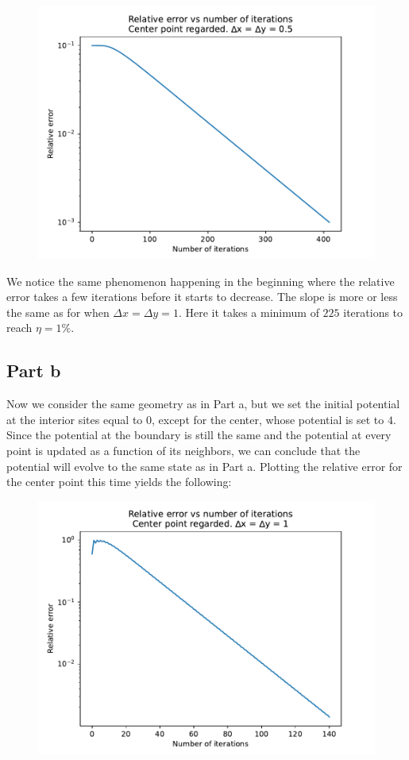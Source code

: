 \documentclass[a4paper,12pt]{article}
\begin{document}
\begin{figure}[!ht]
  \centering
  \includegraphics[scale=0.49]{img/4_1a_errorvsn_smallerd.pdf}
\end{figure}

We notice the same phenomenon happening in the beginning where the relative error takes a few iterations before it
starts to decrease. The slope is more or less the same as for when $\Delta x = \Delta y = 1$. Here it takes a minimum
of $225$ iterations to reach $\eta = 1\%$.

\subsection*{Part b}

Now we consider the same geometry as in Part a, but we set the initial potential at the interior sites equal to $0$,
except for the center, whose potential is set to $4$. Since the potential at the boundary is still the same and the
potential at every point is updated as a function of its neighbors, we can conclude that the potential will evolve to
the same state as in Part a. Plotting the relative error for the center point this time yields the following:

\begin{figure}[!ht]
  \centering
  \includegraphics[scale=0.49]{img/4_1b_errorvsn.pdf}
\end{figure}
\end{document}
